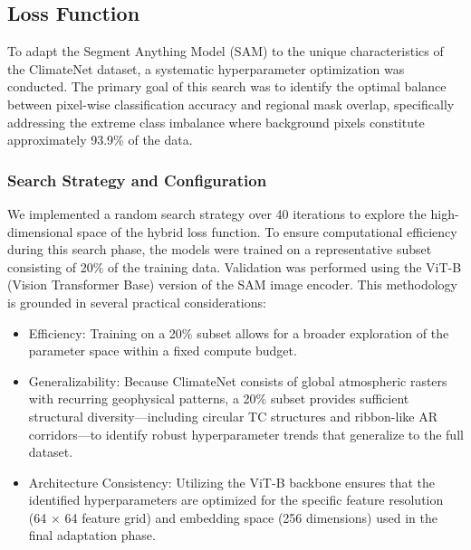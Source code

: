 

\subsection{Loss Function}
To adapt the Segment Anything Model (SAM) to the unique characteristics of the ClimateNet dataset, a systematic hyperparameter optimization was conducted. The primary goal of this search was to identify the optimal balance between pixel-wise classification accuracy and regional mask overlap, specifically addressing the extreme class imbalance where background pixels constitute approximately 93.9\% of the data.

\subsubsection{Search Strategy and Configuration}\label{searchstrat}  

We implemented a random search strategy over 40 iterations to explore the high-dimensional space of the hybrid loss function. To ensure computational efficiency during this search phase, the models were trained on a representative subset consisting of 20\% of the training data. Validation was performed using the ViT-B (Vision Transformer Base) version of the SAM image encoder. 
This methodology is grounded in several practical considerations:

\begin{itemize}
\item Efficiency: Training on a 20\% subset allows for a broader exploration of the parameter space within a fixed compute budget.
\item Generalizability: Because ClimateNet consists of global atmospheric rasters with recurring geophysical patterns, a 20\% subset provides sufficient structural diversity—including circular TC structures and ribbon-like AR corridors—to identify robust hyperparameter trends that generalize to the full dataset.
\item Architecture Consistency: Utilizing the ViT-B backbone ensures that the identified hyperparameters are optimized for the specific feature resolution (64 $\times$ 64 feature grid) and embedding space (256 dimensions) used in the final adaptation phase.
\end{itemize}

